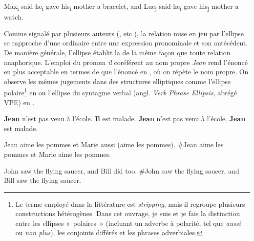 \ex    *Max\textsubscript{i} said he\textsubscript{i} gave his\textsubscript{i} mother a bracelet, and Luc\textsubscript{j} said he\textsubscript{i} gave his\textsubscript{j} mother a watch.\label{ch1:ex9d}
\z
\z

Comme signalé par plusieurs auteurs (\citealt{GrinderEtAl1971,HankamerEtAl1976,Zribi-Hertz1986,Gardent1991,GinzburgEtAlToAppear}, etc.), la relation mise en jeu par l’ellipse se rapproche d’une  ordinaire entre une expression pronominale et son antécédent. De manière générale, l’ellipse établit la  de la même façon que toute relation ana\-phorique. L’emploi du pronom \textit{il} coréférent au nom propre \textit{Jean} rend l’énoncé en  plus acceptable en termes de  que l’énoncé en , où on répète le nom propre. On observe les mêmes jugements dans des structures elliptiques comme l’ellipse polaire\footnote{Le terme employé dans la littérature est \textit{stripping}, mais il regroupe plusieurs constructions hétérogènes. Dans cet ouvrage, je suis \citet{Abeille2005,Abeille2006} et je fais la distinction entre les ellipses «~polaires~» (incluant un adverbe à polarité, tel que \textit{aussi} ou \textit{non plus}), les conjoints différés et les phrases adverbiales.} en  ou l’ellipse du syntagme verbal (angl. \textit{Verb Phrase Ellipsis}, abrégé VPE) en .  

\ea
\ea  \textbf{Jean} n’est pas venu à l’école. \textbf{Il} est malade.\label{ch1:ex10a}  
\ex  \textbf{Jean} n’est pas venu à l’école. \textbf{Jean} est malade.\label{ch1:ex10b} 
\z
\z

\ea \label{ch1:ex11}
\ea  Jean aime les pommes et Marie aussi (aime les pommes).  
\ex  \#Jean aime les pommes et Marie aime les pommes. 
\z
\z

\ea \label{ch1:ex12}
\ea  John saw the flying saucer, and Bill did too. \citep{Dalrymple2005}
\ex  \#John saw the flying saucer, and Bill saw the flying saucer. 
\z
\z

